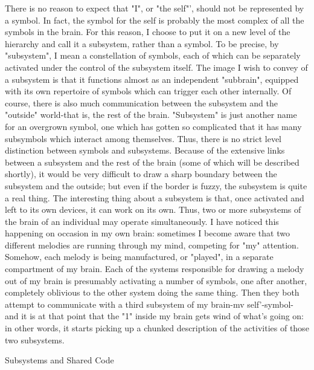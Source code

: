There is no reason to expect that "I", or "the self"', should not be represented by a
symbol. In fact, the symbol for the self is probably the most complex of all the symbols
in the brain. For this reason, I choose to put it on a new level of the hierarchy and call it a
subsystem, rather than a symbol. To be precise, by "subsystem", I mean a constellation of
symbols, each of which can be separately activated under the control of the subsystem
itself. The image I wish to convey of a subsystem is that it functions almost as an
independent "subbrain", equipped with its own repertoire of symbols which can trigger
each other internally. Of course, there is also much communication between the
subsystem and the "outside" world-that is, the rest of the brain. "Subsystem" is just
another name for an overgrown symbol, one which has gotten so complicated that it has
many subsymbols which interact among themselves. Thus, there is no strict level
distinction between symbols and subsystems.
        Because of the extensive links between a subsystem and the rest of the brain
(some of which will be described shortly), it would be very difficult to draw a sharp
boundary between the subsystem and the outside; but even if the border is fuzzy, the
subsystem is quite a real thing. The interesting thing about a subsystem is that, once
activated and left to its own devices, it can work on its own. Thus, two or more
subsystems of the brain of an individual may operate simultaneously. I have noticed this
happening on occasion in my own brain: sometimes I become aware that two different
melodies are running through my mind, competing for "my" attention. Somehow, each
melody is being manufactured, or "played", in a separate compartment of my brain. Each
of the systems responsible for drawing a melody out of my brain is presumably activating
a number of symbols, one after another, completely oblivious to the other system doing
the same thing. Then they both attempt to communicate with a third subsystem of my
brain-mv self'-symbol- and it is at that point that the "1" inside my brain gets wind of
what's going on: in other words, it starts picking up a chunked description of the activities
of those two subsystems.





                             Subsystems and Shared Code

